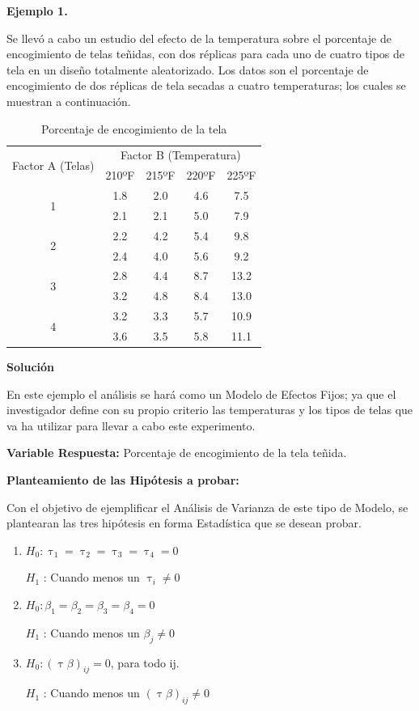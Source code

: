 \documentclass[12pt,letterpaper]{report}
\begin{document}
\textbf{Ejemplo 1.}

Se llevó a cabo un estudio del efecto de la temperatura sobre el porcentaje de encogimiento de
telas teñidas, con dos réplicas para cada uno de cuatro tipos de tela en un diseño totalmente
aleatorizado. Los datos son el porcentaje de encogimiento de dos réplicas de tela secadas a
cuatro temperaturas; los cuales se muestran a continuación.

\begin{table}[htb]
\centering
\begin{tabular}{||c|c|c|c|c||}
\hline
\hline
\multirow{2}{*}{Factor A (Telas)} & \multicolumn{4}{c||}{Factor B (Temperatura)} \\
\cline{2-5}
                   &210ºF&215ºF&220ºF&225ºF \\
\hline
\multirow{2}{*}{1} &1.8&2.0&4.6&7.5 \\
                   &2.1&2.1&5.0&7.9 \\
\hline
\multirow{2}{*}{2} &2.2&4.2&5.4&9.8 \\
                   &2.4&4.0&5.6&9.2 \\
\hline
\multirow{2}{*}{3} &2.8&4.4&8.7&13.2 \\
                   &3.2&4.8&8.4&13.0 \\
\hline
\multirow{2}{*}{4} &3.2&3.3&5.7&10.9 \\
                   &3.6&3.5&5.8&11.1 \\
\hline
\hline

\end{tabular}
\caption{Porcentaje de encogimiento de la tela}
\end{table}
\newpage

\textbf{Solución}

En este ejemplo el análisis se hará como un Modelo de Efectos Fijos; ya que el
investigador define con su propio criterio las temperaturas y los tipos de telas que va ha utilizar para llevar a cabo este experimento.

\textbf{Variable Respuesta:} Porcentaje de encogimiento de la tela teñida.

\textbf{Planteamiento de las Hipótesis a probar:}

Con el objetivo de ejemplificar el Análisis de Varianza de este tipo de Modelo, se plantearan
las tres hipótesis en forma Estadística que se desean probar.
\begin{enumerate}
\item $H_0 : \uptau_1 = \uptau_2 = \uptau_3 = \uptau_4 = 0$

      $H_1$ : Cuando menos un $\uptau_i \not= 0$

\item $H_0 : \beta_1 = \beta_2 = \beta_3 = \beta_4 = 0$

      $H_1$ : Cuando menos un $\beta_j \not= 0$

\item $H_0 : (\uptau\beta)_{ij} = 0$, para todo ij.

      $H_1$ : Cuando menos un $(\uptau\beta)_{ij} \not= 0$
\end{enumerate}
\end{document}
